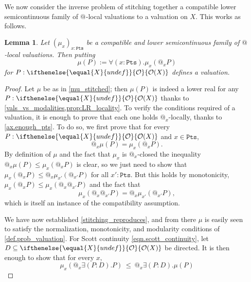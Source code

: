 \documentclass[reqno,11pt]{amsproc}
\makeatletter
\theoremstyle{plain}
\newtheorem{lemma}[theorem]{Lemma}
\theoremstyle{definition}
\newcommand{\pt}{x}
\newcommand{\Op}[1][undef]{\ifthenelse{\equal{#1}{undef}}{\mathcal{O}}{\mathcal{O}(#1)}}
\newcommand{\pts}{\mathtt{Pts}}		%
\newcommand{\atsymbol}{{@}}
\newcommand{\at}[1][\pt]{\atsymbol_{#1}}
\numberwithin{equation}{section}
\makeatother
\begin{document}
We now consider the inverse problem of stitching together a compatible lower semicontinuous family of $\at[]$-local valuations to a valuation on $X$. This works as follows.

\begin{lemma}\label{lemma.compat_lowersemi_stitched}
	Let $(\mu_\pt)_{\pt : \pts}$ be a compatible and lower semicontinuous family of $\at[]$-local valuations. Then putting
	\begin{equation}
		\label{mu_stitched}
		\mu(P) := \forall (\pt : \pts) . \mu_\pt(\at P)
	\end{equation}
	for $P : \Op[X]$ defines a valuation.
\end{lemma}

\begin{proof}
	Let $\mu$ be as in \eqref{mu_stitched}; then $\mu(P)$ is indeed a lower real for any $P:\Op[X]$ thanks to \cref{vals_vs_modalities,prop:LR_locality}. To verify the conditions required of a valuation, it is enough to prove that each one holds $\at$-locally, thanks to \cref{ax.enough_pts}. To do so, we first prove that for every $P : \Op[X]$ and $\pt\in\pts$,
	\begin{equation}
		\label{stitching_reproduces}
		\at \mu(P) = \mu_\pt(\at P).
	\end{equation}
	By definition of $\mu$ and the fact that $\mu_\pt$ is $\at$-closed the inequality $\at \mu(P) \le \mu_\pt(\at P)$ is clear, so we just need to show that $\mu_\pt(\at P) \le \at \mu_{\pt'}(\at[\pt'] P)$ for all $\pt' : \pts$. But this holds by monotonicity, $\mu_\pt(\at P)\leq\mu_\pt(\at\at[\pt']P)$ and the fact that
	\[
		\mu_\pt(\at \at[\pt'] P) = \at \mu_{\pt'}(\at[\pt'] P),
	\]
	which is itself an instance of the compatibility assumption.

	We have now established \eqref{stitching_reproduces}, and from there $\mu$ is easily seen to satisfy the normalization, monotonicity, and modularity conditions of \cref{def.prob_valuation}. For Scott continuity \eqref{eqn.scott_continuity}, let $D \subseteq \Op[X]$ be directed. It is then enough to show that for every $\pt$,
	\begin{equation}
		\label{goal_continuous}
		\mu_\pt(\at \exists (P : D) . P) \: \le \: \at \exists (P : D). \mu(P)
	\end{equation}


\end{proof}
\end{document}

